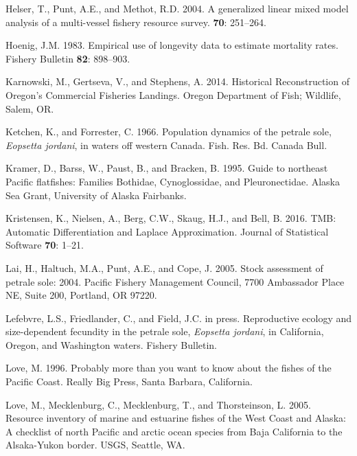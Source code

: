 \documentclass[12pt,]{article}
\begin{document}
\hypertarget{ref-helser_generalized_2004}{}
Helser, T., Punt, A.E., and Methot, R.D. 2004. A generalized linear
mixed model analysis of a multi-vessel fishery resource survey.
\textbf{70}: 251--264.

\hypertarget{ref-hoenig_empirical_1983}{}
Hoenig, J.M. 1983. Empirical use of longevity data to estimate mortality
rates. Fishery Bulletin \textbf{82}: 898--903.

\hypertarget{ref-karnowski_historical_2014}{}
Karnowski, M., Gertseva, V., and Stephens, A. 2014. Historical
Reconstruction of Oregon's Commercial Fisheries Landings. Oregon
Department of Fish; Wildlife, Salem, OR.

\hypertarget{ref-ketchen_population_1966}{}
Ketchen, K., and Forrester, C. 1966. Population dynamics of the petrale
sole, \emph{Eopsetta jordani}, in waters off western Canada. Fish. Res.
Bd. Canada Bull.

\hypertarget{ref-kramer_guide_1995}{}
Kramer, D., Barss, W., Paust, B., and Bracken, B. 1995. Guide to
northeast Pacific flatfishes: Families Bothidae, Cynoglossidae, and
Pleuronectidae. Alaska Sea Grant, University of Alaska Fairbanks.

\hypertarget{ref-kristensen_tmb:_2016}{}
Kristensen, K., Nielsen, A., Berg, C.W., Skaug, H.J., and Bell, B. 2016.
TMB: Automatic Differentiation and Laplace Approximation. Journal of
Statistical Software \textbf{70}: 1--21.

\hypertarget{ref-lai_stock_2005}{}
Lai, H., Haltuch, M.A., Punt, A.E., and Cope, J. 2005. Stock assessment
of petrale sole: 2004. Pacific Fishery Management Council, 7700
Ambassador Place NE, Suite 200, Portland, OR 97220.

\hypertarget{ref-lefebvre_reproductive_nodate}{}
Lefebvre, L.S., Friedlander, C., and Field, J.C. in press. Reproductive
ecology and size-dependent fecundity in the petrale sole, \emph{Eopsetta
jordani}, in California, Oregon, and Washington waters. Fishery
Bulletin.

\hypertarget{ref-love_milton_probably_1996}{}
Love, M. 1996. Probably more than you want to know about the fishes of
the Pacific Coast. Really Big Press, Santa Barbara, California.

\hypertarget{ref-love_milton_resource_2005}{}
Love, M., Mecklenburg, C., Mecklenburg, T., and Thorsteinson, L. 2005.
Resource inventory of marine and estuarine fishes of the West Coast and
Alaska: A checklist of north Pacific and arctic ocean species from Baja
California to the Alsaka-Yukon border. USGS, Seattle, WA.
\end{document}
